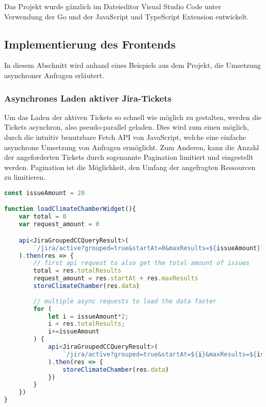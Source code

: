 Das Projekt wurde gänzlich im Dateieditor Visual Studio Code
unter Verwendung der Go und der JavaScript und TypeScript Extension entwickelt.

\subsection{Implementierung des Frontends}
In diesem Abschnitt wird anhand eines Beispiels aus dem Projekt, die Umsetzung
asynchroner Anfragen erläutert.

\subsubsection{Asynchrones Laden aktiver Jira-Tickets}
Um das Laden der aktiven Tickets so schnell wie möglich zu gestalten, werden die
Tickets asynchron, also pseudo-parallel geladen. Dies wird zum einen möglich, durch
die intuitiv benutzbare Fetch API
von JavaScript, welche eine einfache asynchrone Umsetzung von Anfragen ermöglicht.
Zum Anderen, kann die Anzahl der angeforderten Tickets durch sogenannte Pagination
limitiert und eingestellt werden. Pagination ist die Möglichkeit, den Umfang 
der angefragten Ressourcen zu limitieren.

\begin{lstlisting}[caption=TypeScript Funktion zum asynchronen Laden aktiver Tickets (\textit{frontend/src/ts/dashboard.ts}),language=TypeScript]
const issueAmount = 20

function loadClimateChamberWidget(){
    var total = 0
    var request_amount = 0

    api<JiraGroupedCCQueryResult>(
        `/jira/active?grouped=true&startAt=0&maxResults=${issueAmount}`
    ).then(res => {
        // first api request to also get the total amount of issues
        total = res.totalResults
        request_amount = res.startAt + res.maxResults
        storeClimateChamber(res.data)
        
        // multiple async requests to load the data faster
        for (
            let i = issueAmount*2;
            i < res.totalResults;
            i+=issueAmount
        ) {
            api<JiraGroupedCCQueryResult>(
                `/jira/active?grouped=true&startAt=${i}&maxResults=${issueAmount}`
            ).then(res => {
                storeClimateChamber(res.data)
            })
        }
    })  
}
\end{lstlisting}

